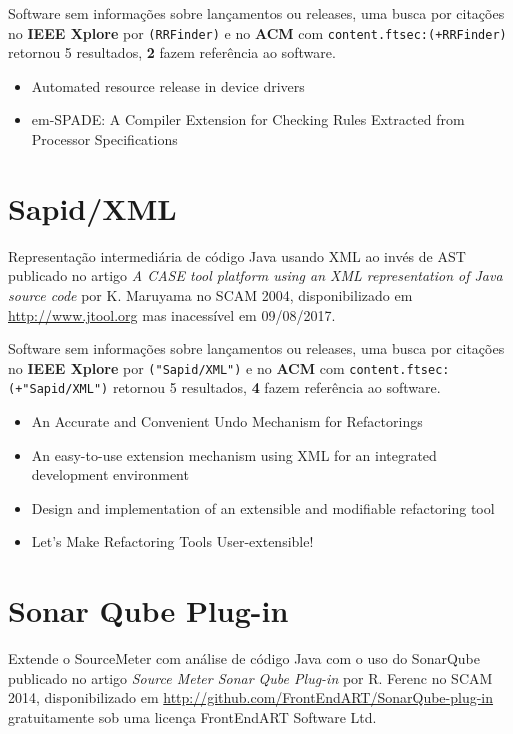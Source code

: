 Software sem informações sobre lançamentos ou releases,
uma busca por citações no {\bf IEEE Xplore} por
\texttt{(RRFinder)}
e no {\bf ACM} com
\texttt{content.ftsec:(+RRFinder)}
retornou
5 resultados,
{\bf 2} fazem referência ao software.

\begin{itemize}
\item Automated resource release in device drivers
\item em-SPADE: A Compiler Extension for Checking Rules Extracted from Processor Specifications
\end{itemize}

\section{Sapid/XML}

Representação intermediária de código Java usando XML ao invés de AST
publicado no artigo {\it A CASE tool platform using an XML representation of Java source code}
por K. Maruyama
no SCAM 2004,
disponibilizado em \url{http://www.jtool.org}
mas inacessível em 09/08/2017.

Software sem informações sobre lançamentos ou releases,
uma busca por citações no {\bf IEEE Xplore} por
\texttt{("Sapid/XML")}
e no {\bf ACM} com
\texttt{content.ftsec:(+"Sapid/XML")}
retornou
5 resultados,
{\bf 4} fazem referência ao software.

\begin{itemize}
\item An Accurate and Convenient Undo Mechanism for Refactorings
\item An easy-to-use extension mechanism using XML for an integrated development environment
\item Design and implementation of an extensible and modifiable refactoring tool
\item Let's Make Refactoring Tools User-extensible!
\end{itemize}

\section{Sonar Qube Plug-in}

Extende o SourceMeter com análise de código Java com o uso do SonarQube
publicado no artigo {\it Source Meter Sonar Qube Plug-in}
por R. Ferenc
no SCAM 2014,
disponibilizado em \url{http://github.com/FrontEndART/SonarQube-plug-in}
gratuitamente
sob uma licença FrontEndART Software Ltd.

